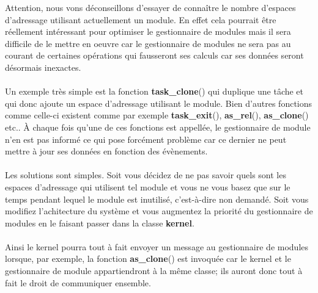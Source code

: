 \documentclass[10pt,a4wide]{article}
\begin{document}
Attention, nous vons d\'econseillons d'essayer de conna\^itre le nombre
d'espaces d'adressage utilisant actuellement un module. En effet cela pourrait
\^etre r\'eellement int\'eressant pour optimiser le gestionnaire de modules
mais il sera difficile de le mettre en oeuvre car le gestionnaire de
modules ne sera pas au courant de certaines op\'erations qui fausseront
ses calculs car ses donn\'ees seront d\'esormais inexactes.

\paragraph{}

Un exemple tr\`es simple est la fonction \textbf{task\_clone}() qui duplique
une t\^ache et qui donc ajoute un espace d'adressage utilisant le module.
Bien d'autres fonctions comme celle-ci existent comme par exemple
\textbf{task\_exit}(), \textbf{as\_rel}(), \textbf{as\_clone}() etc..
\`A chaque fois qu'une de ces fonctions est appell\'ee, le gestionnaire
de module n'en est pas inform\'e ce qui pose forc\'ement probl\`eme car
ce dernier ne peut mettre \`a jour ses donn\'ees en fonction des
\'ev\`enements.

\paragraph{}

Les solutions sont simples. Soit vous d\'ecidez de ne pas savoir quels
sont les espaces d'adressage qui utilisent tel module et vous ne vous basez
que sur le temps pendant lequel le module est inutilis\'e, c'est-\`a-dire
non demand\'e. Soit vous modifiez l'achitecture du syst\`eme et vous augmentez
la priorit\'e du gestionnaire de modules en le faisant passer dans la classe
\textbf{kernel}.

\paragraph{}

Ainsi le kernel pourra tout \`a fait envoyer un message au gestionnaire de
modules lorsque, par exemple, la fonction \textbf{as\_clone}() est invoqu\'ee
car le kernel et le gestionnaire de module appartiendront \`a la m\^eme classe;
ils auront donc tout \`a fait le droit de communiquer ensemble.

\paragraph{}
\end{document}
